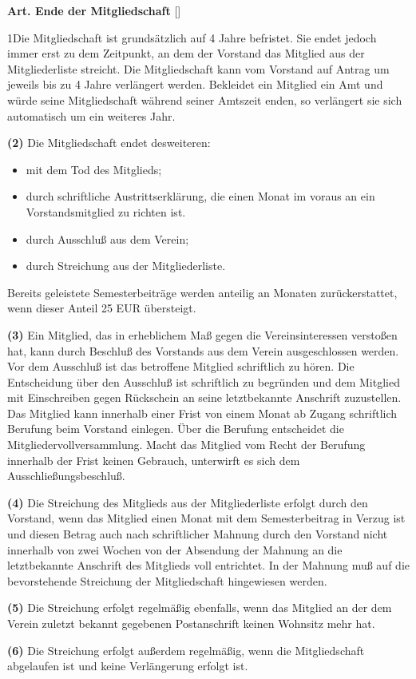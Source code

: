 \documentclass[12pt]{article}
\newcommand{\Satz}[2]{

\begin{samepage}
{\bf (#1)} #2
\end{samepage}
}
\newenvironment{Artikel}[2]{
\bigskip \centerline{{\bf Art. #1} [#2]}
\nopagebreak
}{
}
\begin{document}
\begin{Artikel}{10}{Ende der Mitgliedschaft}

\Satz{1}{Die Mitgliedschaft ist grundsätzlich auf 4 Jahre befristet.
Sie endet jedoch immer erst zu dem Zeitpunkt, an dem der Vorstand das
Mitglied aus der Mitgliederliste streicht.
Die Mitgliedschaft kann vom Vorstand auf Antrag um jeweils bis zu 4 Jahre 
verlängert werden.
Bekleidet ein Mitglied ein Amt und würde seine Mitgliedschaft während seiner
Amtszeit enden, so verlängert sie sich automatisch um ein weiteres Jahr.}

\Satz{2}{Die Mitgliedschaft endet desweiteren:
\begin{itemize}
\item mit dem Tod des Mitglieds;
\item durch schriftliche Austrittserklärung, die einen Monat im voraus an
ein Vorstandsmitglied zu richten ist. 
\item durch Ausschluß aus dem Verein;
\item durch Streichung aus der Mitgliederliste.
\end{itemize}
Bereits geleistete Semesterbeiträge werden anteilig an Monaten zurückerstattet, wenn
dieser Anteil 25 EUR übersteigt.}

\Satz{3}{Ein Mitglied, das in erheblichem Maß gegen die Vereinsinteressen
verstoßen hat, kann durch Beschluß des Vorstands aus dem Verein ausgeschlossen
werden. Vor dem Ausschluß ist das betroffene Mitglied schriftlich zu hören. Die
Entscheidung über den Ausschluß ist schriftlich zu begründen und dem Mitglied
mit Einschreiben gegen Rückschein an seine letztbekannte Anschrift zuzustellen.
Das Mitglied kann innerhalb einer Frist von einem Monat ab Zugang schriftlich
Berufung beim Vorstand einlegen. Über die Berufung entscheidet die
Mitgliedervollversammlung. Macht das Mitglied vom Recht der Berufung innerhalb
der Frist keinen Gebrauch, unterwirft es sich dem Ausschließungsbeschluß.}

\Satz{4}{Die Streichung des Mitglieds aus der Mitgliederliste erfolgt durch den
Vorstand, wenn das Mitglied einen Monat mit dem Semesterbeitrag in Verzug ist
und diesen Betrag auch nach schriftlicher Mahnung durch den Vorstand nicht
innerhalb von zwei Wochen von der Absendung der Mahnung an die letztbekannte
Anschrift des Mitglieds voll entrichtet. In der Mahnung muß auf die
bevorstehende Streichung der Mitgliedschaft hingewiesen werden.}

\Satz{5}{Die Streichung erfolgt regelmäßig ebenfalls, wenn das Mitglied an der
dem Verein zuletzt bekannt gegebenen Postanschrift keinen Wohnsitz mehr hat.}

\Satz{6}{Die Streichung erfolgt außerdem regelmäßig, wenn die Mitgliedschaft
abgelaufen ist und keine Verlängerung erfolgt ist.}

\end{Artikel}
\end{document}
